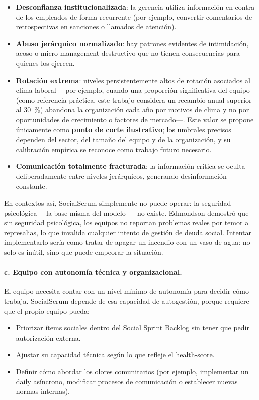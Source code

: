\begin{itemize}
    \item \textbf{Desconfianza institucionalizada}: la gerencia utiliza información en contra de los empleados de forma recurrente (por ejemplo, convertir comentarios de retrospectivas en sanciones o llamados de atención).
    \item \textbf{Abuso jerárquico normalizado}: hay patrones evidentes de intimidación, acoso o micro-management destructivo que no tienen consecuencias para quienes los ejercen.
    \item \textbf{Rotación extrema}: niveles persistentemente altos de rotación asociados al clima laboral ---por ejemplo, cuando una proporción significativa del equipo (como referencia práctica, este trabajo considera un recambio anual superior al 30~\%) abandona la organización cada año por motivos de clima y no por oportunidades de crecimiento o factores de mercado---. Este valor se propone únicamente como \textbf{punto de corte ilustrativo}; los umbrales precisos dependen del sector, del tamaño del equipo y de la organización, y su calibración empírica se reconoce como trabajo futuro necesario.
    \item \textbf{Comunicación totalmente fracturada}: la información crítica se oculta deliberadamente entre niveles jerárquicos, generando desinformación constante.
\end{itemize}

En contextos así, SocialScrum simplemente no puede operar: la seguridad psicológica ---la base misma del modelo \cite{edmondson1999psychological}--- no existe. Edmondson demostró que sin seguridad psicológica, los equipos no reportan problemas reales por temor a represalias, lo que invalida cualquier intento de gestión de deuda social. Intentar implementarlo sería como tratar de apagar un incendio con un vaso de agua: no solo es inútil, sino que puede empeorar la situación.

\paragraph{c. Equipo con autonomía técnica y organizacional.}

El equipo necesita contar con un nivel mínimo de autonomía para decidir cómo trabaja. SocialScrum depende de esa capacidad de autogestión, porque requiere que el propio equipo pueda:

\begin{itemize}
    \item Priorizar ítems sociales dentro del Social Sprint Backlog sin tener que pedir autorización externa.
    \item Ajustar su capacidad técnica según lo que refleje el \gls{health-score}.
    \item Definir cómo abordar los olores comunitarios (por ejemplo, implementar un daily asíncrono, modificar procesos de comunicación o establecer nuevas normas internas).
\end{itemize}

